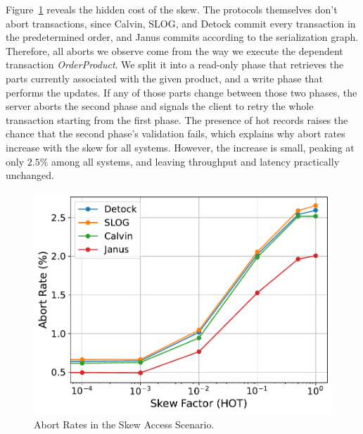 Figure~\ref{fig: abort-rates} reveals the hidden cost of the skew. The protocols themselves don't abort transactions, since Calvin, SLOG, and Detock commit every transaction in the predetermined order, and Janus commits according to the serialization graph. Therefore, all aborts we observe come from the way we execute the dependent transaction \textit{OrderProduct}. We split it into a read-only phase that retrieves the parts currently associated with the given product, and a write phase that performs the updates. If any of those parts change between those two phases, the server aborts the second phase and signals the client to retry the whole transaction starting from the first phase. The presence of hot records raises the chance that the second phase's validation fails, which explains why abort rates increase with the skew for all systems. However, the increase is small, peaking at only $2.5\%$ among all systems, and leaving throughput and latency practically unchanged.

\begin{figure}[ht]
  \centering
  \includegraphics[width=\columnwidth]{figures/Abort Rates.pdf}
  \caption{Abort Rates in the Skew Access Scenario.}
  \label{fig: abort-rates}
\end{figure}

